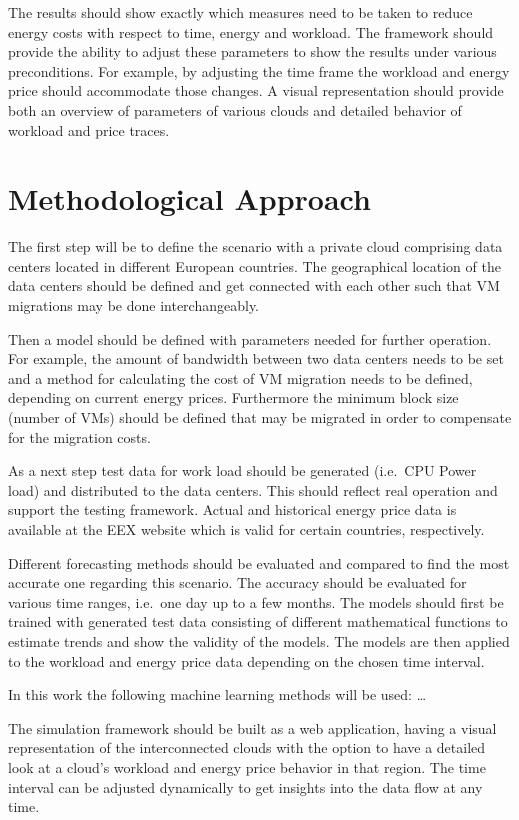 \documentclass[a4paper]{article}
\begin{document}
The results should show exactly which measures need to be taken to reduce energy costs with respect to time, energy and workload. The framework should provide the ability to adjust these parameters to show the results under various preconditions. For example, by adjusting the time frame the workload and energy price should accommodate those changes. A visual representation should provide both an overview of parameters of various clouds and detailed behavior of workload and price traces. 


\section{Methodological Approach}

The first step will be to define the scenario with a private cloud comprising data centers located in different European countries. The geographical location of the data centers should be defined and get connected with each other such that VM migrations may be done interchangeably. 

Then a model should be defined with parameters needed for further operation. For example, the amount of bandwidth between two data centers needs to be set and a method for calculating the cost of VM migration needs to be defined, depending on current energy prices. Furthermore the minimum block size (number of VMs) should be defined that may be migrated in order to compensate for the migration costs.

As a next step test data for work load should be generated (i.e.\ CPU Power load) and distributed to the data centers. This should reflect real operation and support the testing framework. Actual and historical energy price data is available at the EEX website which is valid for certain countries, respectively. 

Different forecasting methods should be evaluated and compared to find the most accurate one regarding this scenario. The accuracy should be evaluated for various time ranges, i.e.\ one day up to a few months. The models should first be trained with generated test data consisting of different mathematical functions to estimate trends and show the validity of the models. The models are then applied to the workload and energy price data depending on the chosen time interval. 

In this work the following machine learning methods will be used: \ldots

The simulation framework should be built as a web application, having a visual representation of the interconnected clouds with the option to have a detailed look at a cloud’s workload and energy price behavior in that region. The time interval can be adjusted dynamically to get insights into the data flow at any time.
\end{document}

